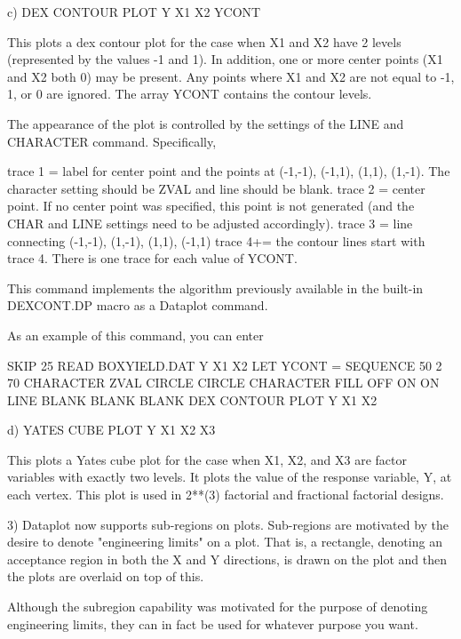 {    c) DEX CONTOUR PLOT Y X1 X2 YCONT

       This plots a dex contour plot for the case when X1 and X2
       have 2 levels (represented by the values -1 and 1). In
       addition, one or more center points (X1 and X2 both 0)
       may be present.  Any points where X1 and X2 are not equal
       to -1, 1, or 0 are ignored.  The array YCONT contains the
       contour levels.

       The appearance of the plot is controlled by the settings
       of the LINE and CHARACTER command.  Specifically,

          trace 1 = label for center point and the points
                    at (-1,-1), (-1,1), (1,1), (1,-1).  The
                    character setting should be ZVAL and line
                    should be blank.
          trace 2 = center point.  If no center point was specified,
                    this point is not generated (and the CHAR and LINE
                    settings need to be adjusted accordingly).
          trace 3 = line connecting (-1,-1), (1,-1), (1,1), (-1,1)
          trace 4+= the contour lines start with trace 4.  There is
                    one trace for each value of YCONT.
     
       This command implements the algorithm previously available
       in the built-in DEXCONT.DP macro as a Dataplot command.

       As an example of this command, you can enter

          SKIP 25
          READ BOXYIELD.DAT Y X1 X2
          LET YCONT = SEQUENCE 50 2 70
          CHARACTER ZVAL CIRCLE CIRCLE
          CHARACTER FILL OFF ON ON
          LINE BLANK BLANK BLANK
          DEX CONTOUR PLOT Y X1 X2

    d) YATES CUBE PLOT Y X1 X2 X3

       This plots a Yates cube plot for the case when X1, X2, and
       X3 are factor variables with exactly two levels.  It plots
       the value of the response variable, Y, at each vertex.
       This plot is used in 2**(3) factorial and fractional
       factorial designs.

 3) Dataplot now supports sub-regions on plots.  Sub-regions are
    motivated by the desire to denote "engineering limits"
    on a plot.  That is, a rectangle, denoting an acceptance
    region in both the X and Y directions, is drawn on the
    plot and then the plots are overlaid on top of this.

    Although the subregion capability was motivated for the
    purpose of denoting engineering limits, they can in fact
    be used for whatever purpose you want.

}
